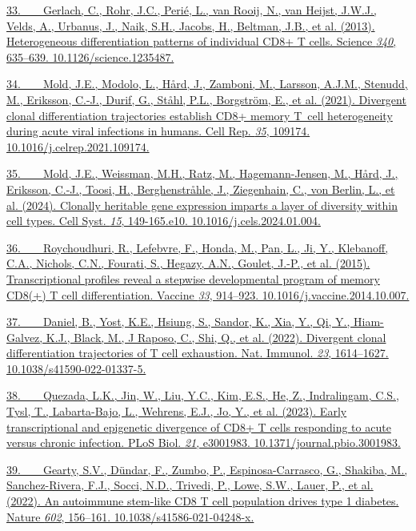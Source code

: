 \href{https://sciwheel.com/work/bibliography/425675}{33.~  Gerlach, C.,
Rohr, J.C., Perié, L., van Rooij, N., van Heijst, J.W.J., Velds, A.,
Urbanus, J., Naik, S.H., Jacobs, H., Beltman, J.B., et al. (2013).
Heterogeneous differentiation patterns of individual CD8+ T cells.
Science \emph{340}, 635--639. 10.1126/science.1235487.}

\href{https://sciwheel.com/work/bibliography/11099644}{34.~  Mold, J.E.,
Modolo, L., Hård, J., Zamboni, M., Larsson, A.J.M., Stenudd, M.,
Eriksson, C.-J., Durif, G., Ståhl, P.L., Borgström, E., et al. (2021).
Divergent clonal differentiation trajectories establish CD8+ memory
T~cell heterogeneity during acute viral infections in humans. Cell Rep.
\emph{35}, 109174. 10.1016/j.celrep.2021.109174.}

\href{https://sciwheel.com/work/bibliography/16029036}{35.~  Mold, J.E.,
Weissman, M.H., Ratz, M., Hagemann-Jensen, M., Hård, J., Eriksson,
C.-J., Toosi, H., Berghenstråhle, J., Ziegenhain, C., von Berlin, L., et
al. (2024). Clonally heritable gene expression imparts a layer of
diversity within cell types. Cell Syst. \emph{15}, 149-165.e10.
10.1016/j.cels.2024.01.004.}

\href{https://sciwheel.com/work/bibliography/1306566}{36.~  Roychoudhuri,
R., Lefebvre, F., Honda, M., Pan, L., Ji, Y., Klebanoff, C.A., Nichols,
C.N., Fourati, S., Hegazy, A.N., Goulet, J.-P., et al. (2015).
Transcriptional profiles reveal a stepwise developmental program of
memory CD8(+) T cell differentiation. Vaccine \emph{33}, 914--923.
10.1016/j.vaccine.2014.10.007.}

\href{https://sciwheel.com/work/bibliography/13843025}{37.~  Daniel, B.,
Yost, K.E., Hsiung, S., Sandor, K., Xia, Y., Qi, Y., Hiam-Galvez, K.J.,
Black, M., J Raposo, C., Shi, Q., et al. (2022). Divergent clonal
differentiation trajectories of T cell exhaustion. Nat. Immunol.
\emph{23}, 1614--1627. 10.1038/s41590-022-01337-5.}

\href{https://sciwheel.com/work/bibliography/14304004}{38.~  Quezada,
L.K., Jin, W., Liu, Y.C., Kim, E.S., He, Z., Indralingam, C.S., Tysl,
T., Labarta-Bajo, L., Wehrens, E.J., Jo, Y., et al. (2023). Early
transcriptional and epigenetic divergence of CD8+ T cells responding to
acute versus chronic infection. PLoS Biol. \emph{21}, e3001983.
10.1371/journal.pbio.3001983.}

\href{https://sciwheel.com/work/bibliography/12129174}{39.~  Gearty,
S.V., Dündar, F., Zumbo, P., Espinosa-Carrasco, G., Shakiba, M.,
Sanchez-Rivera, F.J., Socci, N.D., Trivedi, P., Lowe, S.W., Lauer, P.,
et al. (2022). An autoimmune stem-like CD8 T cell population drives type
1 diabetes. Nature \emph{602}, 156--161. 10.1038/s41586-021-04248-x.}

